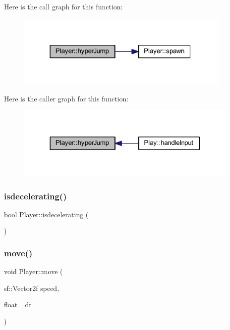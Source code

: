 Here is the call graph for this function\+:
\nopagebreak
\begin{figure}[H]
\begin{center}
\leavevmode
\includegraphics[width=292pt]{class_player_a012354ce1dfa33d6393c41afc4db0e6c_cgraph}
\end{center}
\end{figure}
Here is the caller graph for this function\+:
\nopagebreak
\begin{figure}[H]
\begin{center}
\leavevmode
\includegraphics[width=306pt]{class_player_a012354ce1dfa33d6393c41afc4db0e6c_icgraph}
\end{center}
\end{figure}
\mbox{\label{class_player_af318e11ad06e49d34f6a2ad4e4310e06}} 
\subsubsection{\texorpdfstring{isdecelerating()}{isdecelerating()}}
{\footnotesize\ttfamily bool Player\+::isdecelerating (\begin{DoxyParamCaption}{ }\end{DoxyParamCaption})}

\mbox{\label{class_player_a1b72ddc438471f7feb33b2b0b32cf303}} 
\subsubsection{\texorpdfstring{move()}{move()}}
{\footnotesize\ttfamily void Player\+::move (\begin{DoxyParamCaption}\item[{sf\+::\+Vector2f}]{speed,  }\item[{float}]{\+\_\+dt }\end{DoxyParamCaption})}

